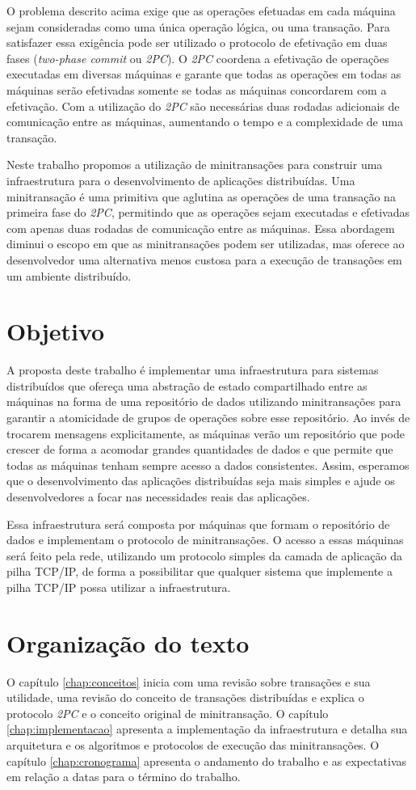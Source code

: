 \documentclass[11pt,twoside,a4paper]{book}
\begin{document}
O problema descrito acima exige que as operações efetuadas em cada máquina sejam consideradas como uma única operação lógica, ou uma transação. Para satisfazer essa exigência pode ser utilizado o protocolo de efetivação em duas fases (\emph{two-phase commit} ou \emph{2PC}). O \emph{2PC} coordena a efetivação de operações executadas em diversas máquinas e garante que todas as operações em todas as máquinas serão efetivadas somente se todas as máquinas concordarem com a efetivação. Com a utilização do \emph{2PC} são necessárias duas rodadas adicionais de comunicação entre as máquinas, aumentando o tempo e a complexidade de uma transação.

Neste trabalho propomos a utilização de minitransações para construir uma infraestrutura para o desenvolvimento de aplicações distribuídas. Uma minitransação é uma primitiva que aglutina as operações de uma transação na primeira fase do \emph{2PC}, permitindo que as operações sejam executadas e efetivadas com apenas duas rodadas de comunicação entre as máquinas. Essa abordagem diminui o escopo em que as minitransações podem ser utilizadas, mas oferece ao desenvolvedor uma alternativa menos custosa para a execução de transações em um ambiente distribuído.

\section{Objetivo}
\label{sec:objetivo}
A proposta deste trabalho é implementar uma infraestrutura para sistemas distribuídos que ofereça uma abstração de estado compartilhado entre as máquinas na forma de uma repositório de dados utilizando minitransações para garantir a atomicidade de grupos de operações sobre esse repositório. Ao invés de trocarem mensagens explicitamente, as máquinas verão um repositório que pode crescer de forma a acomodar grandes quantidades de dados e que permite que todas as máquinas tenham sempre acesso a dados consistentes. Assim, esperamos que o desenvolvimento das aplicações distribuídas seja mais simples e ajude os desenvolvedores a focar nas necessidades reais das aplicações.

Essa infraestrutura será composta por máquinas que formam o repositório de dados e implementam o protocolo de minitransações. O acesso a essas máquinas será feito pela rede, utilizando um protocolo simples da camada de aplicação da pilha TCP/IP, de forma a possibilitar que qualquer sistema que implemente a pilha TCP/IP possa utilizar a infraestrutura.

\section{Organização do texto}
\label{sec:organizacao_do_texto}
O capítulo \ref{chap:conceitos} inicia com uma revisão sobre transações e sua utilidade, uma revisão do conceito de transações distribuídas e explica o protocolo \emph{2PC} e o conceito original de minitransação. O capítulo \ref{chap:implementacao} apresenta a implementação da infraestrutura e detalha sua arquitetura e os algoritmos e protocolos de execução das minitransações. O capítulo \ref{chap:cronograma} apresenta o andamento do trabalho e as expectativas em relação a datas para o término do trabalho.
\end{document}
